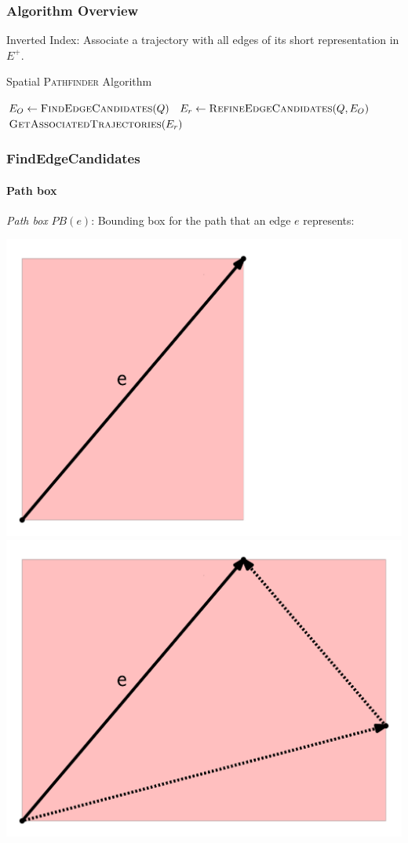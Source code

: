 \documentclass[10pt, t,
aspectratio=1610,%
]{beamer}
\newcommand{\pathfinder}{\textsc{Pathfinder}\xspace}
\newcommand{\findEdgeCandidates}{FindEdgeCandidates\xspace}
\newcommand{\refineEdgeCandidates}{RefineEdgeCandidates\xspace}
\newcommand{\getAssociatedTrajectories}{GetAssociatedTrajectories\xspace}
\begin{document}
\begin{frame}
	\frametitle{Algorithm Overview}
	Inverted Index: Associate a trajectory with all edges of its short representation in $E^+$. \pause
	\begin{algorithm}[H]
		\renewcommand{\thealgorithm}{}
		{\small
			\caption{Spatial \pathfinder Algorithm}
			\begin{algorithmic}[1]
				 \pause
				\State $E_O \gets \Call{\findEdgeCandidates}{Q}$ \label{line:edge_revrieval} \pause
				\State $E_r \gets \Call{\refineEdgeCandidates}{Q, E_O}$ \pause
				\State \Return $\Call{\getAssociatedTrajectories}{E_r}$
				\EndProcedure
			\end{algorithmic}
			\label{alg:spatial_pathfinder}
		}
	\end{algorithm}
\end{frame}

\begin{frame}
	\frametitle{\findEdgeCandidates}
	\framesubtitle{Path box}
	\emph{Path box} $PB(e)$: Bounding box for the path that an edge $e$ represents:

	\includegraphics[width=.45\columnwidth]{images/simplePathBox} \pause
	\includegraphics[width=.45\columnwidth]{images/pathBox}
\end{frame}
\end{document}
